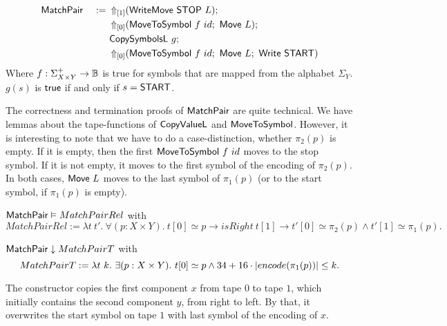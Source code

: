 \begin{definition}[$\MS{MatchPair}$]
  \label{def:MatchPair}
  ~
  \begin{alignat*}{2}
    &\MS{MatchPair}&~:=~& \LiftTapes{(\MS{WriteMove}~\MS{STOP}~L)}{\Vector{1}} \Seq \\
    &              &    & \LiftTapes{(\MS{MoveToSymbol}~f~id \Seq \MS{Move}~L)}{\Vector{0}} \Seq \\
    &              &    & \MS{CopySymbolsL}~g\Seq \\
    &              &    & \LiftTapes{(\MS{MoveToSymbol}~f~id \Seq \MS{Move}~L \Seq \MS{Write}~\MS{START})}{\Vector{0}}
  \end{alignat*}
  Where $f : \Sigma_{X \times Y}^+ \to \Bool$ is true for symbols that are mapped from the alphabet $\Sigma_Y$.  $g(s)$ is $\true$ if and only if
  $s=\MS{START}$.
\end{definition}

The correctness and termination proofs of $\MS{MatchPair}$ are quite technical.  We have lemmas about the tape-functions of $\MS{CopyValueL}$ and
$\MS{MoveToSymbol}$.  However, it is interesting to note that we have to do a case-distinction, whether $\pi_2(p)$ is empty.  If it is empty, then the
first $\MS{MoveToSymbol}~f~id$ moves to the stop symbol.  If it is not empty, it moves to the first symbol of the encoding of $\pi_2(p)$.  In both
cases, $\MS{Move}~L$ moves to the last symbol of $\pi_1(p)$ (or to the start symbol, if $\pi_1(p)$ is empty).

\begin{lemma}
  \label{lem:MatchPair_Realise}
  $\MS{MatchPair} \Realise MatchPairRel$ with
  \small
  \[
    MatchPairRel := \lambda t~t'.~\forall (p: X \times Y).~t[0] \simeq p \rightarrow isRight~t[1] \rightarrow t'[0] \simeq \pi_2(p) \land t'[1] \simeq \pi_1(p).
  \]
\end{lemma}
\begin{lemma}
  \label{lem:MatchPair_TerminatesIn}
  $\MS{MatchPair} \TerminatesIn MatchPairT$ with
  \[
    MatchPairT := \lambda t~k.~\exists (p: X \times Y).~t[0] \simeq p \land 34 + 16 \cdot \size{\pi_1(p)} \leq k.
  \]
\end{lemma}

The constructor copies the first component $x$ from tape $0$ to tape $1$, which initially contains the second component $y$, from right to left.  By
that, it overwrites the start symbol on tape $1$ with last symbol of the encoding of $x$.

